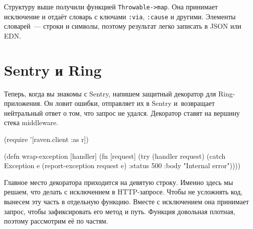 \else

\begin{english}
  \begin{json}
  \end{json}
\end{english}

\fi

\fi



Структуру выше получили функцией \texttt{Throw\-able->map}. Она принимает
исключение и отдаёт словарь с ключами \verb|:via|, \verb|:cause| и
другими. Элементы словарей~--- строки и символы, поэтому результат легко
записать в JSON или EDN.

\section{Sentry и Ring}


Теперь, когда вы знакомы с Sentry, напишем защитный декоратор для
Ring-приложения. Он ловит ошибки, отправляет их в Sentry и~возвращает
нейтральный ответ о том, что запрос не удался. Декоратор ставят на вершину стека
middleware.

\begin{english}
  \begin{clojure/lines}
(require '[raven.client :as r])

(defn wrap-exception
  [handler]
  (fn [request]
    (try
      (handler request)
      (catch Exception e
        (report-exception request e)
        {:status 500
         :body "Internal error"}))))
  \end{clojure/lines}
\end{english}

Главное место декоратора приходится на девятую строку. Именно здесь мы решаем,
что делать с исключением в HTTP-запросе. Чтобы не усложнять код, вынесем эту
часть в отдельную функцию. Вместе с исключением она принимает запрос, чтобы
зафиксировать его метод и путь. Функция довольная плотная, поэтому рассмотрим её
по частям.


